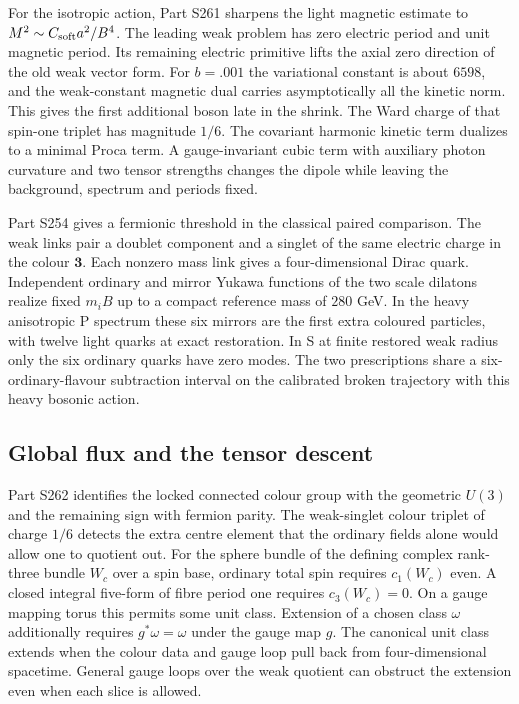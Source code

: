 \documentclass[aps,prd,reprint,onecolumn,nofootinbib,amsmath,amssymb]{revtex4-2}
\begin{document}
For the isotropic action, Part S261 sharpens the light magnetic estimate to $M^2\sim C_{\rm soft}a^2/B^4$. The leading weak problem has zero electric period and unit magnetic period. Its remaining electric primitive lifts the axial zero direction of the old weak vector form. For $b=.001$ the variational constant is about $6598$, and the weak-constant magnetic dual carries asymptotically all the kinetic norm. This gives the first additional boson late in the shrink. The Ward charge of that spin-one triplet has magnitude $1/6$. The covariant harmonic kinetic term dualizes to a minimal Proca term. A gauge-invariant cubic term with auxiliary photon curvature and two tensor strengths changes the dipole while leaving the background, spectrum and periods fixed.

Part S254 gives a fermionic threshold in the classical paired comparison. The weak links pair a doublet component and a singlet of the same electric charge in the colour $\mathbf 3$. Each nonzero mass link gives a four-dimensional Dirac quark. Independent ordinary and mirror Yukawa functions of the two scale dilatons realize fixed $m_i B$ up to a compact reference mass of $280$ GeV. In the heavy anisotropic P spectrum these six mirrors are the first extra coloured particles, with twelve light quarks at exact restoration. In S at finite restored weak radius only the six ordinary quarks have zero modes. The two prescriptions share a six-ordinary-flavour subtraction interval on the calibrated broken trajectory with this heavy bosonic action.

\subsection{Global flux and the tensor descent}

Part S262 identifies the locked connected colour group with the geometric $U(3)$ and the remaining sign with fermion parity. The weak-singlet colour triplet of charge $1/6$ detects the extra centre element that the ordinary fields alone would allow one to quotient out. For the sphere bundle of the defining complex rank-three bundle $W_c$ over a spin base, ordinary total spin requires $c_1(W_c)$ even. A closed integral five-form of fibre period one requires $c_3(W_c)=0$. On a gauge mapping torus this permits some unit class. Extension of a chosen class $\omega$ additionally requires $g^*\omega=\omega$ under the gauge map $g$. The canonical unit class extends when the colour data and gauge loop pull back from four-dimensional spacetime. General gauge loops over the weak quotient can obstruct the extension even when each slice is allowed.
\end{document}
